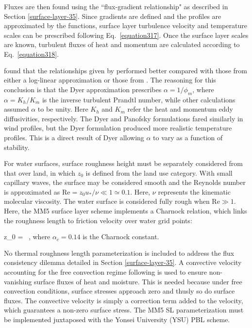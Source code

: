 Fluxes are then found using the ``flux-gradient relationship" as described in Section \autoref{surface-layer-35}. Since gradients are defined and the profiles are approximated by the  \citet{Dyer} functions, surface layer turbulence velocity and temperature scales can be prescribed following Eq.~\eqref{equation317}. Once the surface layer scales are known, turbulent fluxes of heat and momentum are calculated according to Eq.~\eqref{equation318}.

 \citet{Paulson} found that the relationships given by  \citet{Dyer} performed better compared with those from either a log-linear approximation or those from  \citet{Pan63}. The reasoning for this conclusion is that the Dyer approximation prescribes $\alpha = 1/\phi_m$, where $\alpha = K_h/K_m$ is the inverse turbulent Prandtl number, while other calculations assumed $\alpha$ to be unity. Here $K_h$ and $K_m$ refer the heat and momentum eddy diffusivities, respectively. The Dyer and Panofsky formulations fared similarly in wind profiles, but the Dyer formulation produced more realistic temperature profiles. This is a direct result of Dyer allowing $\alpha$ to vary as a function of stability.

For water surfaces, surface roughness height must be separately considered from that over land, in which $z_0$ is defined from the land use category. With small capillary waves, the surface may be considered smooth and the Reynolds number is approximated as $\mathrm{Re} = z_0 u_*/\nu \ll 1 \simeq 0.1 $. Here, $\nu$ represents the kinematic molecular viscosity. The water surface is considered fully rough when $\mathrm{Re} \gg 1$. Here, the MM5 surface layer scheme implements a Charnock relation, which links the roughness length to friction velocity over water grid points:

\be
z_0 =  \mbox{ ,} \label{equation323}
\ee
\noindent
 where $\alpha_c = 0.14$ is the Charnock constant.

No thermal roughness length parameterization is included to address the flux consistency dilemma detailed in Section \autoref{surface-layer-35}. A convective velocity accounting for the free convection regime following  \citet{Beljaars} is used to ensure non-vanishing surface fluxes of heat and moisture. This is needed because under free convection conditions, surface stresses approach zero and thusly so do surface fluxes. The convective velocity is simply a correction term added to the velocity, which guarantees a non-zero surface stress. The MM5 SL parameterization must be implemented juxtaposed with the Yonsei University (YSU) PBL scheme.

